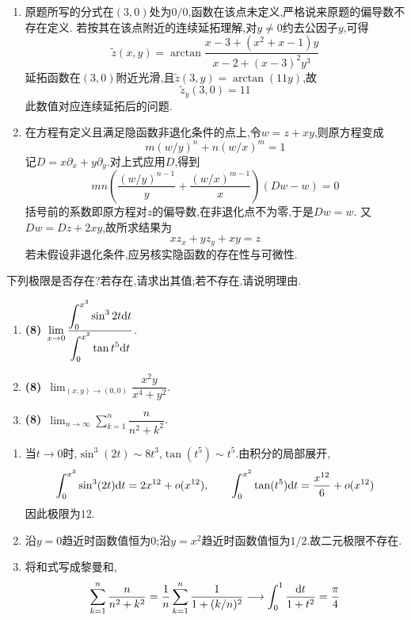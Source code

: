 \documentclass{ctexart}
\begin{document}
\begin{solution}
\begin{enumerate}[label=\tbf{(\arabic*)},leftmargin=*]
\item 原题所写的分式在$(3,0)$处为$0/0$,函数在该点未定义,严格说来原题的偏导数不存在定义.
若按其在该点附近的连续延拓理解,对$y\neq0$约去公因子$y$,可得
\[\widetilde z(x,y)=\arctan\dfrac{x-3+(x^2+x-1)y}{x-2+(x-3)^2y^3}\]
延拓函数在$(3,0)$附近光滑,且$\widetilde z(3,y)=\arctan(11y)$,故
\[\widetilde z_y(3,0)=11\]
此数值对应连续延拓后的问题.
\item 在方程有定义且满足隐函数非退化条件的点上,令$w=z+xy$,则原方程变成
\[m(w/y)^n+n(w/x)^m=1\]
记$D=x\partial_x+y\partial_y$.对上式应用$D$,得到
\[mn\left(\dfrac{(w/y)^{n-1}}{y}+\dfrac{(w/x)^{m-1}}{x}\right)(Dw-w)=0\]
括号前的系数即原方程对$z$的偏导数,在非退化点不为零,于是$Dw=w$.
又$Dw=Dz+2xy$,故所求结果为
\[xz_x+yz_y+xy=z\]
若未假设非退化条件,应另核实隐函数的存在性与可微性.
\end{enumerate}
\end{solution}
\begin{problem}[3.(24\songti{分})]
下列极限是否存在?若存在,请求出其值;若不存在,请说明理由.
        \begin{enumerate}[label=\tbf{(\arabic*)}]
            \item \textbf{(8)}\ \(\displaystyle\lim_{x\to0}\dfrac{\displaystyle\int_0^{x^3}\sin^32t\mathrm{d} t}{\displaystyle\int_0^{x^2}\tan t^5\mathrm{d} t}\).
            \item \textbf{(8)}\ \(\displaystyle\lim_{(x,y)\to(0,0)}\dfrac{x^2y}{x^4+y^2}\).
            \item \textbf{(8)}\ \(\displaystyle\lim_{n\to\infty}\sum_{k=1}^{n}\dfrac{n}{n^2+k^2}\).
        \end{enumerate}
\end{problem}
\begin{solution}
\begin{enumerate}[label=\tbf{(\arabic*)},leftmargin=*]
\item 当$t\to0$时,$\sin^3(2t)\sim8t^3$,$\tan(t^5)\sim t^5$.由积分的局部展开,
\[\int_0^{x^3}\sin^3(2t)\mathrm{d} t=2x^{12}+o(x^{12}),\qquad
\int_0^{x^2}\tan(t^5)\mathrm{d} t=\dfrac{x^{12}}6+o(x^{12})\]
因此极限为$12$.
\item 沿$y=0$趋近时函数值恒为$0$;沿$y=x^2$趋近时函数值恒为$1/2$.故二元极限不存在.
\item 将和式写成黎曼和,
\[\sum_{k=1}^n\dfrac{n}{n^2+k^2}
=\dfrac1n\sum_{k=1}^n\dfrac{1}{1+(k/n)^2}
\longrightarrow\int_0^1\dfrac{\mathrm{d} t}{1+t^2}=\dfrac\pi4\]
\end{enumerate}
\end{solution}
\end{document}
